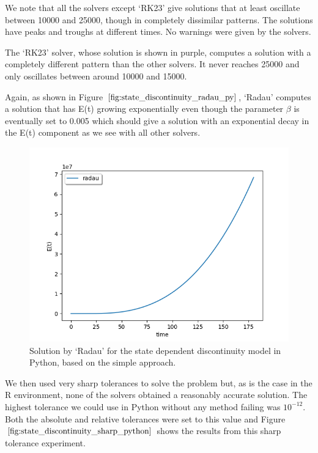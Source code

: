 We note that all the solvers except `RK23' give solutions that at least oscillate between 10000 and 25000, though in completely dissimilar patterns. The solutions have peaks and troughs at different times. No warnings were given by the solvers.

The `RK23' solver, whose solution is shown in purple, computes a solution with a completely different pattern than the other solvers. It never reaches 25000 and only oscillates between around 10000 and 15000. 

Again, as shown in Figure $\ref{fig:state_discontinuity_radau_py}$, `Radau' computes a solution that has E(t) growing exponentially even though the parameter $\beta$ is eventually set to 0.005 which should give a solution with an exponential decay in the E(t) component as we see with all other solvers.

\begin{figure}[h]
\centering
\includegraphics[width=0.7\linewidth]{./figures/state_discontinuity_radau_py}
\caption{Solution by `Radau' for the state dependent discontinuity model in Python, based on the simple approach.}
\label{fig:state_discontinuity_radau_py}
\end{figure}

We then used very sharp tolerances to solve the problem but, as is the case in the R environment, none of the solvers obtained a reasonably accurate solution. The highest tolerance we could use in Python without any method failing was $10^{-12}$. Both the absolute and relative tolerances were set to this value and Figure $\ref{fig:state_discontinuity_sharp_python}$ shows the results from this sharp tolerance experiment.

